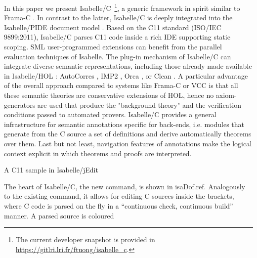 \begin{isabellebody}
\begin{isamarkuptext*}
In this paper we present Isabelle/C~\footnote{The current developer snapshot is provided in
  \url{https://gitlri.lri.fr/ftuong/isabelle_c}.}, a generic framework in
spirit similar to Frama-C \cite{frama-c-home-page}. In contrast to the latter, Isabelle/C is
deeply integrated into the Isabelle/PIDE document model \cite{DBLP:conf/itp/Wenzel14}. Based on
the C11 standard (ISO/IEC 9899:2011), Isabelle/C parses C11 code inside a rich IDE supporting static
scoping. SML user-programmed extensions can benefit from the parallel evaluation techniques of
Isabelle. The plug-in mechanism of Isabelle/C can integrate diverse semantic representations,
including those already made available in Isabelle/HOL \cite{DBLP:books/sp/NipkowPW02}: AutoCorres
\cite{DBLP:conf/pldi/GreenawayLAK14}, IMP2 \cite{DBLP:journals/afp/LammichW19},
Orca \cite{bockenek:hal-02069705}, or Clean \cite{journals/afp/TuongW19}. A particular advantage of
the overall approach compared to systems like Frama-C or VCC is that all these semantic
theories are conservative extensions of HOL, hence no axiom-generators are used that produce the
"background theory" and the verification conditions passed to automated provers. Isabelle/C provides
a general infrastructure for semantic annotations specific for back-ends, i.e. modules that generate
from the C source a set of definitions and derive automatically theorems over them.
Last but not least, navigation features of annotations make the logical context explicit in which 
theorems and proofs are interpreted.%
\end{isamarkuptext*}\isamarkuptrue%
%
\begin{isamarkupfigure*}%
[label = {C-sample},type = {Isa_COL.figure}, args={label = {C-sample},type = {Isa_COL.figure}, Isa_COL.figure.relative_width = {60}, Isa_COL.figure.src = {figures/A-C-Source}, Isa_COL.figure.spawn_columns = {True}}]A C11 sample in Isabelle/jEdit%
\end{isamarkupfigure*}\isamarkuptrue%
%
\begin{isamarkuptext}%
The heart of Isabelle/C, the new  command, is shown in \csname isaDof.ref. 
Analogously to the existing  command, it allows for editing C
sources inside the \isa{{\isacartoucheopen}\ {\isachardot}{\isachardot}\ {\isacartoucheclose}} brackets, where C code is
parsed on the fly in a ``continuous check, continuous build'' manner. A parsed source is coloured

\end{isamarkuptext}
\end{isabellebody}
